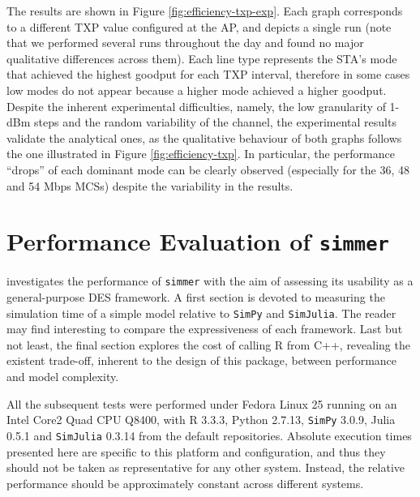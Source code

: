 \documentclass[twoside,nohyper]{tufte-book}
\begin{document}
The results are shown in Figure \ref{fig:efficiency-txp-exp}. Each graph corresponds to a different TXP value configured at the AP, and depicts a single run (note that we performed several runs throughout the day and found no major qualitative differences across them). Each line type represents the STA's mode that achieved the highest goodput for each TXP interval, therefore in some cases low modes do not appear because a higher mode achieved a higher goodput. Despite the inherent experimental difficulties, namely, the low granularity of 1-dBm steps and the random variability of the channel, the experimental results validate the analytical ones, as the qualitative behaviour of both graphs follows the one illustrated in Figure \ref{fig:efficiency-txp}. In particular, the performance ``drops'' of each dominant mode can be clearly observed (especially for the 36, 48 and 54 Mbps MCSs) despite the variability in the results.

\hypertarget{performance-evaluation-of-simmer}{%
\chapter{\texorpdfstring{Performance Evaluation of \texttt{simmer}}{Performance Evaluation of simmer}}\label{performance-evaluation-of-simmer}}

 investigates the performance of \texttt{simmer} with the aim of assessing its usability as a general-purpose DES framework. A first section is devoted to measuring the simulation time of a simple model relative to \texttt{SimPy}\cite[0pt]{SimPy} and \texttt{SimJulia}\cite[0pt]{GitHub:SimJulia}. The reader may find interesting to compare the expressiveness of each framework. Last but not least, the final section explores the cost of calling R from C++, revealing the existent trade-off, inherent to the design of this package, between performance and model complexity.

All the subsequent tests were performed under Fedora Linux 25 running on an Intel Core2 Quad CPU Q8400, with R 3.3.3, Python 2.7.13, \texttt{SimPy} 3.0.9, Julia 0.5.1 and \texttt{SimJulia} 0.3.14 from the default repositories. Absolute execution times presented here are specific to this platform and configuration, and thus they should not be taken as representative for any other system. Instead, the relative performance should be approximately constant across different systems.
\end{document}
